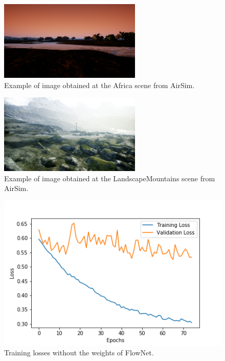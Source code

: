    \begin{figure}[h]
        \centering
        \includegraphics[width=0.65\columnwidth]{figuras/africa.png}
        \caption{Example of image obtained at the Africa scene from AirSim.}
        \label{fig:africa}
    \end{figure}
    
    \begin{figure}[h]
        \centering
        \includegraphics[width=0.65\columnwidth]{figuras/mountains.png}
        \caption{Example of image obtained at the LandscapeMountains scene from AirSim.}
        \label{fig:mountain}
    \end{figure}
    
    \begin{figure}[h]
        \centering
        \includegraphics[width=0.65\columnwidth]{figuras/train_batch_dropout_90.png}
        \caption{Training losses without the weights of FlowNet.}
        \label{fig:train90}
    \end{figure}
    
